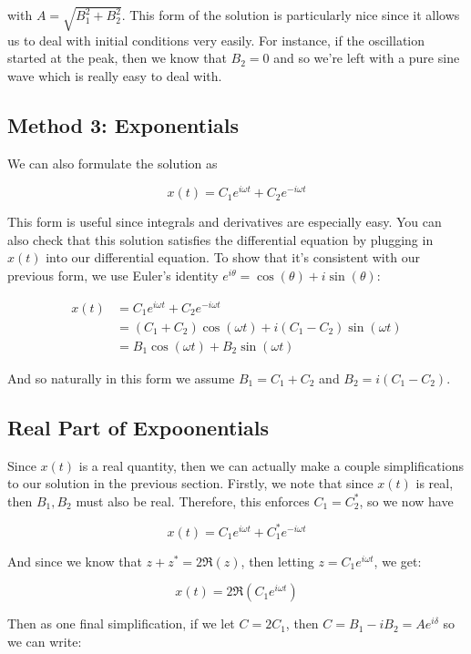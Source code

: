 with $A = \sqrt{B_1^2 + B_2^2}$. This form of the solution is particularly nice since it allows us to deal with initial conditions very easily. For instance, if the oscillation started at the peak, then we know that $B_2 = 0$ and so we're left with a pure sine wave which is really easy to deal with. 

\subsection{Method 3: Exponentials}

We can also formulate the solution as 

\[ x(t) = C_1e^{i\omega t} + C_2e^{-i\omega t}\]

This form is useful since integrals and derivatives are especially easy. You can also check that this solution satisfies the differential equation by plugging in $x(t)$ into our differential equation. To show that it's consistent with our previous form, we use Euler's identity $e^{i\theta} = \cos (\theta) + i\sin (\theta)$: 

\begin{align*}
    x(t) &= C_1e^{i\omega t} + C_2e^{-i\omega t}\\
    &= (C_1 + C_2)\cos(\omega t) + i(C_1 - C_2) \sin (\omega t)\\
    &= B_1 \cos (\omega t) + B_2 \sin (\omega t)
\end{align*}

And so naturally in this form we assume $B_1 = C_1 + C_2$ and $B_2 = i(C_1 - C_2)$. 

\subsection{Real Part of Expoonentials}

Since $x(t)$ is a real quantity, then we can actually make a couple simplifications to our solution in the previous section. Firstly, we note that since $x(t)$ is real, then $B_1, B_2$ must also be real. Therefore, this enforces $C_1 = C_2^*$, so we now have

\[ x(t) = C_1 e^{i\omega t} + C_1^*e^{-i\omega t}\] 

And since we know that $z + z^\ast = 2\Re(z)$, then letting $z = C_1e^{i \omega t}$, we get:

\[ x(t) = 2\Re\left(C_1e^{i\omega t}\right)\] 

Then as one final simplification, if we let $C = 2C_1$, then $C = B_1 - iB_2 = Ae^{i\delta}$ so we can write: 

